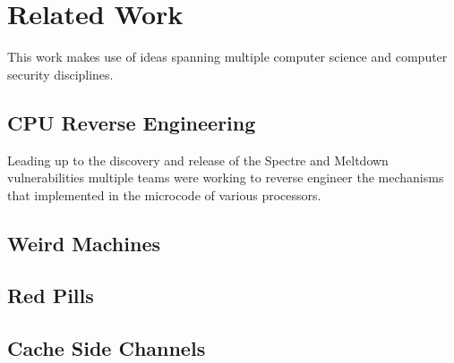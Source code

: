 
\section{Related Work}
\label{sec:related-work}

This work makes use of ideas spanning multiple computer science and computer
security disciplines. 


\subsection{CPU Reverse Engineering}
Leading up to the discovery and release of the Spectre and Meltdown vulnerabilities
multiple teams were working to reverse engineer the mechanisms that implemented in 
the microcode of various processors. 

\subsection{Weird Machines}


\subsection{Red Pills}


\subsection{Cache Side Channels}


